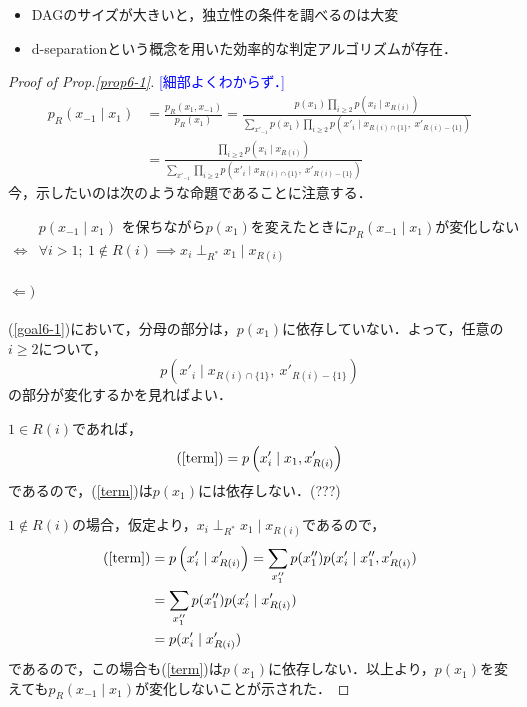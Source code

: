 \documentclass[11pt,a4paper,dvipdfmx]{article}
\theoremstyle{plain}
\newcommand{\equi}{\Longleftrightarrow}
\newcommand{\kcomment}[1]{{\textcolor{blue}{#1}}}
\begin{document}
\begin{itemize}
	\item DAGのサイズが大きいと，独立性の条件を調べるのは大変
	\item d-separationという概念を用いた効率的な判定アルゴリズムが存在．
\end{itemize}


\newpage
\begin{proof}[Proof of Prop.\ref{prop6-1}]
	\kcomment{[細部よくわからず．]}
	\begin{align}
		p_R(x_{-1} \mid x_1)
		&= \frac{p_R(x_1, x_{-1})}{p_R(x_1)}
		= \frac{p(x_1) \prod_{i \geq 2}p(x_i \mid x_{R(i)})}{\sum_{x'_{-1}} p(x_1) \prod_{i \geq 2} p(x'_i \mid x_{R(i) \cap \{1\}}, \ x'_{R(i) - \{1\}}) } \nonumber \\
		&= \frac{ \prod_{i \geq 2}p(x_i \mid x_{R(i)})}{\sum_{x'_{-1}} \prod_{i \geq 2} p \left(x'_i \mid x_{R(i) \cap \{1\}}, \ x'_{R(i) - \{1\}} \right) }
		\label{goal6-1}
	\end{align}
	今，示したいのは次のような命題であることに注意する．
	\begin{screen}
	\begin{align*}
		&p(x_{-1} \mid x_1) \text{ を保ちながら$p(x_1)$を変えたときに$p_R(x_{-1} \mid x_1)$が変化しない} \\
	\equi &\forall i > 1; \ 1 \notin R(i) \implies x_i \perp_{R^*} x_1 \mid x_{R(i)}
	\end{align*}
	\end{screen}
	
	\paragraph{$\Leftarrow)$}
	(\ref{goal6-1})において，分母の部分は，$p(x_1)$に依存していない．よって，任意の$i \geq 2$について，
	\begin{equation}
		p \left(x'_i \mid x_{R(i) \cap \{1\}}, \ x'_{R(i) - \{1\}} \right) \tag{$\star$} \label{term}
	\end{equation}
	の部分が変化するかを見ればよい．
	
	$1 \in R(i)$であれば，
	$$
	(\text{\ref{term}}) = p \left(x'_i \mid x_1, x'_{R(i)} \right)
	$$
	であるので，(\ref{term})は$p(x_1)$には依存しない．(???)
	
	$1 \notin R(i)$の場合，仮定より，$x_i \perp_{R^*} x_1 \mid x_{R(i)}$であるので，
	\begin{align*}
		(\text{\ref{term}})
		&= p \left(x'_i \mid x'_{R(i)} \right)
		= \sum_{x''_1} p(x''_1) p(x'_i \mid x''_1, x'_{R(i)}) \\
		&= \sum_{x''_1} p(x''_1) p(x'_i \mid x'_{R(i)}) \\
		&= p(x'_i \mid x'_{R(i)})
	\end{align*}
	であるので，この場合も(\ref{term})は$p(x_1)$に依存しない．以上より，$p(x_1)$を変えても$p_R(x_{-1} \mid x_1)$が変化しないことが示された．
	

\end{proof}
\end{document}
